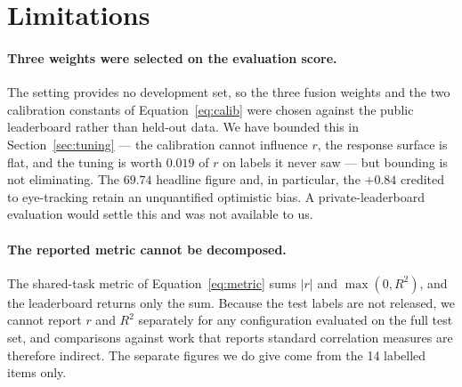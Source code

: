 %

\section*{Limitations}

\paragraph{Three weights were selected on the evaluation score.}
The setting provides no development set, so the three fusion weights
and the two calibration constants of Equation~\ref{eq:calib} were
chosen against the public leaderboard rather than held-out data. We
have bounded this in Section~\ref{sec:tuning} --- the calibration
cannot influence $r$, the response surface is flat, and the tuning is
worth $0.019$ of $r$ on labels it never saw --- but bounding is not
eliminating. The $69.74$ headline figure and, in particular, the
$+0.84$ credited to eye-tracking retain an unquantified optimistic
bias. A private-leaderboard evaluation would settle this and was not
available to us.

\paragraph{The reported metric cannot be decomposed.}
The shared-task metric of Equation~\ref{eq:metric} sums $|r|$ and
$\max(0,R^2)$, and the leaderboard returns only the sum. Because the
test labels are not released, we cannot report $r$ and $R^2$ separately
for any configuration evaluated on the full test set, and comparisons
against work that reports standard correlation measures are therefore
indirect. The separate figures we do give come from the 14 labelled
items only.

